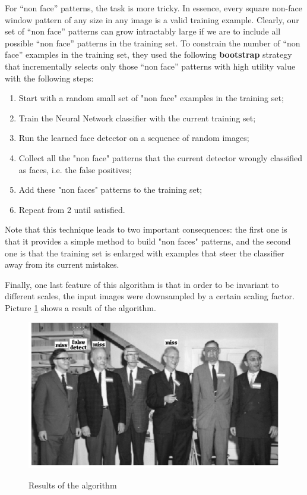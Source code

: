 For “non face” patterns, the task is more tricky. In essence, every square non-face window pattern of any size in any image is a valid training example. Clearly, our set of “non face” patterns can grow intractably large if we are to include all possible “non face” patterns in the training set. To constrain the number of “non face” examples in the training set, they used the following \textbf{bootstrap} strategy that incrementally selects only those “non face” patterns with high utility value with the following steps:

\begin{enumerate}
    \item Start with a random small set of "non face" examples in the training set;
    \item Train the Neural Network classifier with the current training set;
    \item Run the learned face detector on a sequence of random images;
    \item Collect all the "non face" patterns that the current detector wrongly classified as faces, i.e. the false positives;
    \item Add these "non faces" patterns to the training set;
    \item Repeat from 2 until satisfied.
\end{enumerate}

Note that this technique leads to two important consequences: the first one is that it provides a simple method to build "non faces" patterns, and the second one is that the training set is enlarged with examples that steer the classifier away from its current mistakes.

Finally, one last feature of this algorithm is that in order to be invariant to different scales, the input images were downsampled by a certain scaling factor. Picture \ref{poggio_results} shows a result of the algorithm.

\begin{figure}[h!]
		\centering
		\includegraphics[scale = 1.0]{img/poggio_results.jpg}
        \label{poggio_results}
        \caption{Results of the algorithm}
\end{figure}

